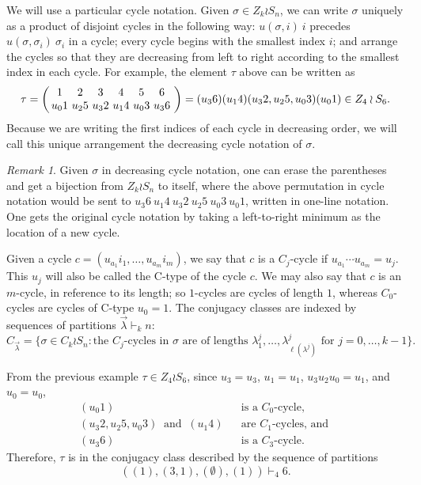 \documentclass[a4paper,12pt]{amsart}
\theoremstyle{plain}
\theoremstyle{definition}
\theoremstyle{remark}
\newtheorem{remark}[theorem]{Remark}
\begin{document}
We will use a particular cycle notation. Given $\sigma \in Z_k \wr S_n$, we can write $\sigma$ uniquely as a product of disjoint cycles in the following way:  $u(\sigma, i)~ i$ precedes $u(\sigma,\sigma_i)~ \sigma_i$ in a cycle; every cycle begins with the smallest index $i$; and arrange the cycles so that they are decreasing from left to right according to the smallest index in each cycle. 
For example, the element $\tau$ above can be written as
 \begin{equation*}
 \tau = 
 \left(\begin{array}{@{\,}c@{\ }c@{\ }c@{\ }c@{\ }c@{\ }c@{\ }}
1&2&3&4&5&6 \\
u_0 1 & u_2 5 & u_3 2& u_1 4 & u_0 3 & u_3 6
\end{array}\right) = (u_3 6)(u_1 4)(u_3 2, u_2 5 , u_0 3)(u_0 1) \in Z_4 \wr S_6.
 \end{equation*}
Because we are writing the first indices of each cycle in decreasing order, we will call this unique arrangement the decreasing cycle notation of $\sigma$. 
\begin{remark}\label{remark:decreasing_cycle_bijection}
Given $\sigma$ in decreasing cycle notation, one can erase the parentheses and get a bijection from $Z_k \wr S_n$ to itself, where the above permutation in cycle notation would be sent to $ u_3 6~u_1 4~u_3 2~u_2 5 ~u_0 3~u_0 1$, written in one-line notation. One gets the original cycle notation by taking a left-to-right minimum as the location of a new cycle.
\end{remark}

Given a cycle $c = (u_{a_1} i_1, \dots, u_{a_m} i_m)$, we say that $c$ is a $C_{j}$-cycle if $u_{a_1} \cdots u_{a_m} = u_j$. This $u_j$ will also be called the C-type of the cycle $c$. 
We may also say that $c$ is an $m$-cycle, in reference to its length; so $1$-cycles are cycles of length $1$, whereas $C_0$-cycles are cycles of C-type $u_0=1$.
The conjugacy classes are indexed by sequences of partitions $\vec{\lambda} \vdash_k n$:
\begin{equation*}
C_{\vec{\lambda}} = \{\sigma \in C_k \wr S_n :
 \text{the $C_j$-cycles in $\sigma$ are of lengths $\lambda^j_1, \dots, \lambda^j_{\ell(\lambda^j)}$ for } j=0, \dots, k-1 \}.
\end{equation*}

From the previous example $\tau \in Z_4 \wr S_6$, since $u_3 = u_3$, $u_1 = u_1$, $u_3 u_2 u_0 = u_1$, and $u_0 = u_0$, 
\begin{align*}
(u_0 1) && \text{is a $C_{0}$-cycle}, \\
(u_3 2, u_2 5 , u_0 3) \ \text{ and } \ (u_1 4) && \text{are $C_{1}$-cycles, and }\\
(u_3 6) && \text{is a $C_{3}$-cycle}.
\end{align*}
Therefore, $\tau$ is in the conjugacy class described by the sequence of partitions \[
((1),(3,1),(\emptyset),(1)) \vdash_4 6.
\]
\end{document}

